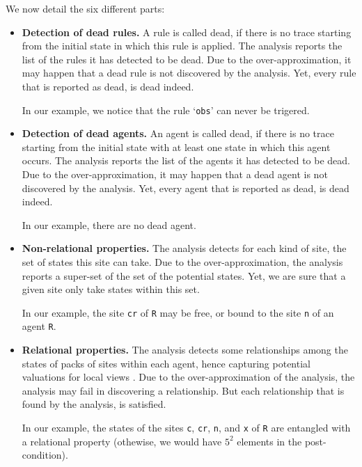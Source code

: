 \documentclass[11pt]{book}
\begin{document}
We now detail the six different parts:
\begin{itemize}
\item \textbf{Detection of dead rules.} A rule is called dead, if there is no trace starting from the initial state in which this rule is applied. The analysis reports the list of the rules it has detected to be dead. Due to the over-approximation, it may happen that a dead rule is not discovered by the analysis. Yet, every rule that is reported as dead, is dead indeed.

In our example, we notice that the rule `\texttt{obs}' can never be trigered.

\item \textbf{Detection of dead agents.} An agent is called dead, if there is no trace starting from the initial state with at least one state in which this agent occurs. The analysis reports the list of the agents it has detected to be dead. Due to the over-approximation, it may happen that a dead agent is not discovered by the analysis. Yet, every agent that is reported as dead, is dead indeed.

In our example, there are no dead agent.

\item \textbf{Non-relational properties.} The analysis detects for each kind of site, the set of states this site can take.
Due to the over-approximation, the analysis reports a super-set of the set of the potential states. Yet, we are sure that a given site only take states within this set.

In our example, the site \texttt{cr} of \texttt{R} may be free, or bound to the site \texttt{n} of an agent \texttt{R}.

\item \textbf{Relational properties.} The analysis detects some relationships among the states of packs of sites within each agent, hence capturing potential valuations for local views \cite{Feret-ICCMSE2007,DanosEtAl-VMCAI08}.
Due to the over-approximation of the analysis, the analysis may fail in discovering a relationship. But each relationship that is found by the analysis, is satisfied.

In our example, the states of the sites \texttt{c}, \texttt{cr}, \texttt{n}, and \texttt{x} of \texttt{R} are entangled with a relational property (othewise, we would have $5^2$ elements in the post-condition).



\end{itemize}
\end{document}
